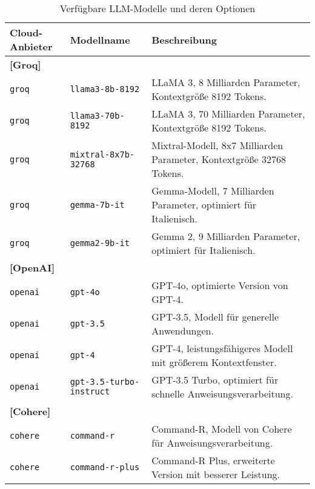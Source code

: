 \documentclass[%
	paper=a4,           %
	12pt,               %
	parskip=full,       %
	oneside,            %
	listof=totoc,		%
	bibliography=totoc,
	toc=listof,
	toc=chapterentrydotfill %
]{scrreprt}             %
\begin{document}
\begin{table}[H]
    \centering
    \footnotesize
    \begin{tabular}{p{2cm}p{4cm}p{10cm}}
        \toprule
        \textbf{Cloud-Anbieter} & \textbf{Modellname}             & \textbf{Beschreibung}                                                \\
        \midrule
        \multicolumn{3}{l}{\textbf{[Groq]}}                                                                                              \\
        \texttt{groq}           & \texttt{llama3-8b-8192}         & LLaMA 3, 8 Milliarden Parameter, Kontextgröße 8192 Tokens.           \\
        \texttt{groq}           & \texttt{llama3-70b-8192}        & LLaMA 3, 70 Milliarden Parameter, Kontextgröße 8192 Tokens.          \\
        \texttt{groq}           & \texttt{mixtral-8x7b-32768}     & Mixtral-Modell, 8x7 Milliarden Parameter, Kontextgröße 32768 Tokens. \\
        \texttt{groq}           & \texttt{gemma-7b-it}            & Gemma-Modell, 7 Milliarden Parameter, optimiert für Italienisch.     \\
        \texttt{groq}           & \texttt{gemma2-9b-it}           & Gemma 2, 9 Milliarden Parameter, optimiert für Italienisch.          \\
        \midrule
        \multicolumn{3}{l}{\textbf{[OpenAI]}}                                                                                            \\
        \texttt{openai}         & \texttt{gpt-4o}                 & GPT-4o, optimierte Version von GPT-4.                                \\
        \texttt{openai}         & \texttt{gpt-3.5}                & GPT-3.5, Modell für generelle Anwendungen.                           \\
        \texttt{openai}         & \texttt{gpt-4}                  & GPT-4, leistungsfähigeres Modell mit größerem Kontextfenster.        \\
        \texttt{openai}         & \texttt{gpt-3.5-turbo-instruct} & GPT-3.5 Turbo, optimiert für schnelle Anweisungsverarbeitung.        \\
        \midrule
        \multicolumn{3}{l}{\textbf{[Cohere]}}                                                                                            \\
        \texttt{cohere}         & \texttt{command-r}              & Command-R, Modell von Cohere für Anweisungsverarbeitung.             \\
        \texttt{cohere}         & \texttt{command-r-plus}         & Command-R Plus, erweiterte Version mit besserer Leistung.            \\
        \bottomrule
    \end{tabular}
    \caption{Verfügbare LLM-Modelle und deren Optionen}
\end{table}
\end{document}
